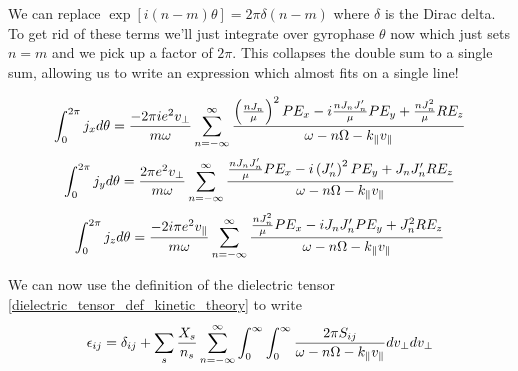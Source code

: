 We can replace $\exp \left[i\left(n - m\right) \theta \right] = 2\pi\delta\left(n-m\right)$ where $\delta$ is the Dirac delta. To get rid of these terms we'll just integrate over gyrophase $\theta$ now which just sets $n=m$ and we pick up a factor of $2\pi$. This collapses the double sum to a single sum, allowing us to write an expression which almost fits on a single line!

\begin{equation}
	\int_0^{2\pi} j_x d\theta = \frac{-2\pi ie^2v_\perp}{m \omega} \sum_{n=-\infty}^\infty \frac{\left(\frac{nJ_n}{\mu}\right)^2 P E_x - i \frac{nJ_n J_n'}{\mu} P E_y + \frac{nJ_n^2}{\mu} R E_z}{\omega-n\Omega-k_\parallel v_\parallel}
\end{equation}
\begin{equation}
	\int_0^{2\pi} j_y d\theta = \frac{2\pi e^2v_\perp}{m \omega} \sum_{n=-\infty}^\infty \frac{\frac{nJ_nJ_n'}{\mu} P E_x - i \left(J_n'\right)^2 P E_y + J_n J_n' R E_z}{\omega-n\Omega-k_\parallel v_\parallel}
\end{equation}
\begin{equation}
	\int_0^{2\pi} j_z d\theta = \frac{-2i\pi e^2v_\parallel}{m \omega} \sum_{n=-\infty}^\infty \frac{\frac{nJ_n^2}{\mu} P E_x - i J_n J_n' P E_y + J_n^2 R E_z}{\omega-n\Omega-k_\parallel v_\parallel}
\end{equation}

We can now use the definition of the dielectric tensor \eqref{dielectric_tensor_def_kinetic_theory} to write
\begin{equation} \label{hot_plasma_dielectric_generic_f}
	\epsilon_{ij} = \delta_{ij} + \sum_s \frac{X_s}{n_s} \sum_{n=-\infty}^\infty \int_0^\infty \int_0^\infty \frac{2\pi S_{ij}}{\omega-n\Omega-k_\parallel v_\parallel} dv_\perp dv_\perp
\end{equation}

